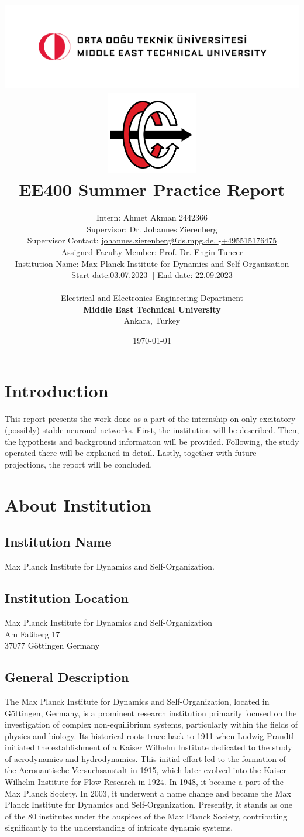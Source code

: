\documentclass[a4paper,12pt]{article}
\title{
\includegraphics[width=17cm]{odtu.png} \\
\includegraphics[width=4cm]{eee.png} \\
\vspace*{0.5in}
\textbf{EE400 Summer Practice Report}
\vspace*{0.25in}
}
\author{Intern: Ahmet Akman 2442366\\
Supervisor: Dr. Johannes Zierenberg\\
Supervisor Contact: \href{mailto: johannes.zierenberg@ds.mpg.de}{ johannes.zierenberg@ds.mpg.de. }-\href{tel:+495515176475}{+495515176475}\\
Assigned Faculty Member: Prof. Dr. Engin Tuncer\\
Institution Name: Max Planck Institute for Dynamics and Self-Organization\\
Start date:03.07.2023 || End date: 22.09.2023\\
        \vspace*{0.25in} \\
        Electrical and Electronics Engineering Department\\
        \textbf{Middle East Technical University}\\
        Ankara, Turkey
       } \date{\today}
\begin{document}


%


\maketitle

\newpage
\tableofcontents
\newpage
\section{Introduction}
This report presents the work done as a part of the internship on only excitatory (possibly) stable neuronal networks. First, the institution will be described. Then, the hypothesis and background information will be provided. Following, the study operated there will be explained in detail. Lastly, together with future projections, the report will be concluded.
\section{About Institution}
\subsection{Institution Name}
Max Planck Institute for Dynamics and Self-Organization.
\subsection{Institution Location}
Max Planck Institute for Dynamics and Self-Organization \\
Am Faßberg 17 \\
37077 Göttingen Germany
\subsection{General Description}
The Max Planck Institute for Dynamics and Self-Organization, located in Göttingen, Germany, is a prominent research institution primarily focused on the investigation of complex non-equilibrium systems, particularly within the fields of physics and biology. Its historical roots trace back to 1911 when Ludwig Prandtl initiated the establishment of a Kaiser Wilhelm Institute dedicated to the study of aerodynamics and hydrodynamics. This initial effort led to the formation of the Aeronautische Versuchsanstalt in 1915, which later evolved into the Kaiser Wilhelm Institute for Flow Research in 1924. In 1948, it became a part of the Max Planck Society. In 2003, it underwent a name change and became the Max Planck Institute for Dynamics and Self-Organization. Presently, it stands as one of the 80 institutes under the auspices of the Max Planck Society, contributing significantly to the understanding of intricate dynamic systems.
\end{document}
